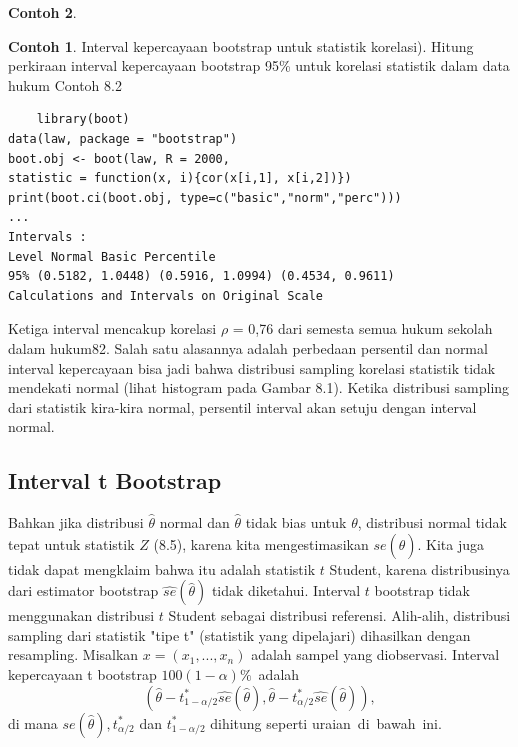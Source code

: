 \documentclass[a4paper,12pt]{article}
\theoremstyle{definition}
\newtheorem{example}{Contoh}[section]
\begin{document}
\begin{example}
\begin{example}
    Interval kepercayaan bootstrap untuk statistik korelasi). Hitung perkiraan interval kepercayaan bootstrap 95\% untuk korelasi statistik dalam data hukum Contoh 8.2
\begin{lstlisting}
    library(boot)
data(law, package = "bootstrap")
boot.obj <- boot(law, R = 2000,
statistic = function(x, i){cor(x[i,1], x[i,2])})
print(boot.ci(boot.obj, type=c("basic","norm","perc")))
...
Intervals :
Level Normal Basic Percentile
95% (0.5182, 1.0448) (0.5916, 1.0994) (0.4534, 0.9611)
Calculations and Intervals on Original Scale
\end{lstlisting}
Ketiga interval mencakup korelasi $\rho $ = 0,76 dari semesta semua hukum sekolah dalam hukum82. Salah satu alasannya adalah perbedaan persentil dan normal interval kepercayaan bisa jadi bahwa distribusi sampling korelasi statistik tidak mendekati normal (lihat histogram pada Gambar 8.1). Ketika
distribusi sampling dari statistik kira-kira normal, persentil interval akan setuju dengan interval normal.
\end{example}
\end{example}

\subsection{Interval t Bootstrap}
Bahkan jika distribusi $\hat{\theta}$ normal dan $\hat{\theta}$ tidak bias untuk $\theta$, distribusi normal tidak tepat untuk statistik $Z$ (8.5), karena kita mengestimasikan $se(\hat{\theta})$.  Kita juga tidak dapat mengklaim bahwa itu adalah statistik $t$ Student, karena distribusinya dari estimator bootstrap $\widehat{se}(\hat{\theta})$ tidak diketahui.  Interval $t$ bootstrap tidak menggunakan distribusi $t$ Student sebagai distribusi referensi. Alih-alih, distribusi sampling dari statistik "tipe t" (statistik yang dipelajari) dihasilkan dengan resampling. Misalkan $x = (x_{1}, ..., x_{n})$ adalah sampel yang diobservasi.  Interval kepercayaan t bootstrap $100(1-\alpha)\%$ adalah
\begin{equation*}
(\hat{\theta}-t_{1-\alpha/2}^{*}\widehat{se}(\hat{\theta}),     \hat{\theta}-t_{\alpha/2}^{*}\widehat{se}(\hat{\theta})),
\end{equation*}
di mana $\widehat{se}(\hat{\theta}), t_{\alpha/2}^{*}$ dan $t_{1-\alpha/2}^{*}$ dihitung seperti uraian di bawah ini.
\end{document}
